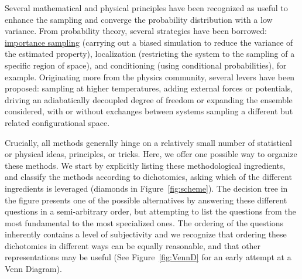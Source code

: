 \documentclass[9pt,review]{livecoms}
\begin{document}
Several mathematical and physical principles have been recognized as useful to enhance the sampling and converge the probability distribution with a low variance.
From probability theory, several strategies have been borrowed: \hyperlink{ref:IS}{importance sampling} (carrying out a biased simulation to reduce the variance of the estimated property), localization (restricting the system to the sampling of a specific region of space), and conditioning (using conditional probabilities), for example. Originating more from the physics community, several levers have been proposed: sampling at higher temperatures, adding external forces or potentials, driving an adiabatically decoupled degree of freedom or expanding the ensemble considered, with or without exchanges between systems sampling a different but related configurational space.

Crucially, all methods generally hinge on a relatively small number of statistical or physical ideas, principles, or tricks. Here, we offer one possible way to organize these methods. We  start by explicitly listing these methodological ingredients, and classify the methods according to dichotomies, asking which of the different ingredients is leveraged (diamonds in Figure~\ref{fig:scheme}). The decision tree in the figure presents one of the possible alternatives by answering these different questions in a semi-arbitrary order, but attempting to list the questions from the most fundamental to the most specialized ones. The ordering of the questions inherently contains a level of subjectivity and we recognize that ordering these dichotomies in different ways can be equally reasonable, and that other representations may be useful (See Figure~\ref{fig:VennD} for an early attempt at a Venn Diagram).
\end{document}
